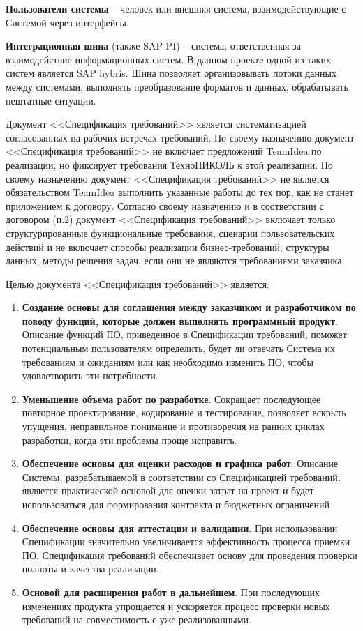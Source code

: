 \textbf{Пользователи системы} -- человек или внешняя система, взаимодействующие с Системой через интерфейсы.

\textbf{Интеграционная шина} (также SAP PI) -- система, ответственная за взаимодействие информационных систем. В данном проекте одной из таких систем является SAP hybris. Шина позволяет организовывать потоки данных между системами, выполнять преобразование форматов и данных, обрабатывать нештатные ситуации. 



Документ <<Спецификация требований>> является систематизацией согласованных на рабочих встречах требований. По своему назначению документ <<Спецификация требований>>  не включает предложений TeamIdea по реализации, но фиксирует требования ТехноНИКОЛЬ к этой реализации. По своему назначению документ <<Спецификация требований>> не является обязательством TeamIdea выполнить указанные работы до тех пор, как не станет приложением к договору. Согласно своему назначению и в соответствии с договором (п.2) документ <<Спецификация требований>> включает только структурированные функциональные требования, сценарии пользовательских действий и не включает способы реализации бизнес-требований, структуры данных, методы решения задач, если они не являются требованиями заказчика. 


Целью документа <<Спецификация требований>> является:

\begin{enumerate}
\item \textbf{Создание основы для соглашения между заказчиком и разработчиком по поводу функций, которые должен выполнять программный продукт}. Описание функций ПО, приведенное в Спецификации требований, поможет потенциальным пользователям определить, будет ли отвечать Система их требованиям и ожиданиям или как необходимо изменить ПО, чтобы удовлетворить эти потребности. 
\item \textbf{Уменьшение объема работ по разработке}. Сокращает последующее повторное проектирование, кодирование и тестирование, позволяет вскрыть упущения, неправильное понимание и противоречия на ранних циклах разработки, когда эти проблемы проще исправить.
\item \textbf{Обеспечение основы для оценки расходов и графика работ}. Описание Системы, разрабатываемой в соответствии со Спецификацией требований, является практической основой для оценки затрат на проект и будет использоваться для формирования контракта и бюджетных ограничений
\item \textbf{Обеспечение основы для аттестации и валидации}. При использовании Спецификации значительно увеличивается эффективность процесса приемки ПО. Спецификация требований обеспечивает основу для проведения проверки полноты и качества реализации.
\item \textbf{Основой для расширения работ в дальнейшем}. При последующих изменениях продукта упрощается и ускоряется процесс проверки новых требований на совместимость с уже реализованными.  
\end{enumerate}

